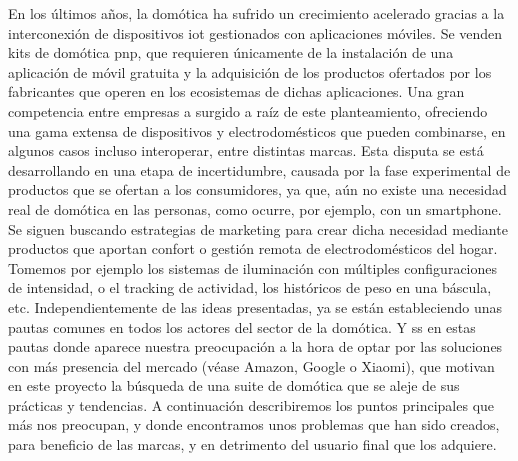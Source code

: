 En los últimos años, la domótica ha sufrido un crecimiento acelerado gracias a la interconexión de dispositivos \gls{iot} gestionados con aplicaciones móviles. Se venden kits de domótica \Gls{pnp}, que requieren únicamente de la instalación de una aplicación de móvil gratuita y la adquisición de los productos ofertados por los fabricantes que operen en los ecosistemas de dichas aplicaciones. Una gran competencia entre empresas a surgido a raíz de este planteamiento, ofreciendo una gama extensa de dispositivos y electrodomésticos que pueden combinarse, en algunos casos incluso interoperar, entre distintas marcas. Esta disputa se está desarrollando en una etapa de incertidumbre, causada por la fase experimental de productos que se ofertan a los consumidores, ya que, aún no existe una necesidad real de domótica en las personas, como ocurre, por ejemplo, con un \gls{smartphone}. Se siguen buscando estrategias de marketing para crear dicha necesidad mediante productos que aportan confort o gestión remota de electrodomésticos del hogar. Tomemos por ejemplo los sistemas de iluminación con múltiples configuraciones de intensidad, o el tracking de actividad, los históricos de peso en una báscula, etc. Independientemente de las ideas presentadas, ya se están estableciendo unas pautas comunes en todos los actores del sector de la domótica. Y ss en estas pautas donde aparece nuestra preocupación a la hora de optar por las soluciones con más presencia del mercado (véase Amazon, Google o Xiaomi), que motivan en este proyecto la búsqueda de una suite de domótica que se aleje de sus prácticas y tendencias. A continuación describiremos los puntos principales que más nos preocupan, y donde encontramos unos problemas que han sido creados, para beneficio de las marcas, y en detrimento del usuario final que los adquiere.

\vspace{1cm}

